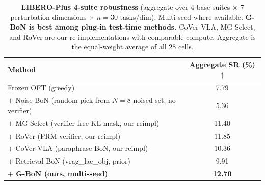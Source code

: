 \begin{table}[h]
\centering
\caption{\textbf{LIBERO-Plus 4-suite robustness} (aggregate over 4 base
suites $\times$ 7 perturbation dimensions $\times$ $n=30$ tasks/dim).
Multi-seed where available. \textbf{G-BoN is best among plug-in
test-time methods.} CoVer-VLA, MG-Select, and RoVer are our
re-implementations with comparable compute. Aggregate is the equal-weight
average of all 28 cells.}
\label{tab:lplus_agg}
\begin{tabular}{lc}
\toprule
Method & Aggregate SR (\%) $\uparrow$ \\
\midrule
Frozen OFT (greedy)                                                     & 7.79 \\
$+$ Noise BoN (random pick from $N{=}8$ noised set, no verifier)        & 5.36 \\
$+$ MG-Select \citep{mgselect2026} (verifier-free KL-mask, our reimpl)  & 11.40 \\
$+$ RoVer \citep{rover2026} (PRM verifier, our reimpl)                  & 11.85 \\
$+$ CoVer-VLA \citep{cover_vla2025} (paraphrase BoN, our reimpl)        & 10.36 \\
$+$ Retrieval BoN (vrag\_lac\_obj, prior)                               &  9.91 \\
\textbf{$+$ G-BoN (ours, multi-seed)}                                   & \textbf{12.70} \\
\bottomrule
\end{tabular}
\end{table}

